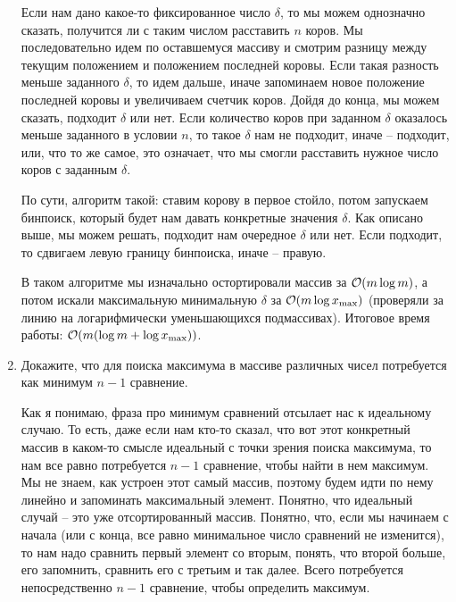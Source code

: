 \begin{enumerate}
\begin{solution}
		Если нам дано какое-то фиксированное число $\delta$, то мы можем однозначно сказать, получится ли с таким числом расставить $n$ коров. Мы последовательно идем по оставшемуся массиву и смотрим разницу между текущим положением и положением последней коровы. Если такая разность меньше заданного $\delta$, то идем дальше, иначе запоминаем новое положение последней коровы и увеличиваем счетчик коров. Дойдя до конца, мы можем сказать, подходит $\delta$ или нет. Если количество коров при заданном $\delta$ оказалось меньше заданного в условии $n$, то такое $\delta$ нам не подходит, иначе -- подходит, или, что то же самое, это означает, что мы смогли расставить нужное число коров с заданным $\delta$.

		По сути, алгоритм такой: ставим корову в первое стойло, потом запускаем бинпоиск, который будет нам давать конкретные значения $\delta$. Как описано выше, мы можем решать, подходит нам очередное $\delta$ или нет. Если подходит, то сдвигаем левую границу бинпоиска, иначе -- правую.

		В таком алгоритме мы изначально остортировали массив за $\mathcal{O}(m \log m)$, а потом искали максимальную минимальную $\delta$ за $\mathcal{O}(m \log{x_{\max}})$ (проверяли за линию на логарифмически уменьшающихся подмассивах). Итоговое время работы: $\mathcal{O}(m (\log{m} + \log{x_{\max}}))$.
	\end{solution}

  \item
    Докажите, что для поиска максимума в массиве различных чисел потребуется
	как минимум $n-1$ сравнение.
	\begin{solution}
		Как я понимаю, фраза про минимум сравнений отсылает нас к идеальному случаю. То есть, даже если нам кто-то сказал, что вот этот конкретный массив в каком-то смысле идеальный с точки зрения поиска максимума, то нам все равно потребуется $n - 1$ сравнение, чтобы найти в нем максимум. Мы не знаем, как устроен этот самый массив, поэтому будем идти по нему линейно и запоминать максимальный элемент. Понятно, что идеальный случай -- это уже отсортированный массив. Понятно, что, если мы начинаем с начала (или с конца, все равно минимальное число сравнений не изменится), то нам надо сравнить первый элемент со вторым, понять, что второй больше, его запомнить, сравнить его с третьим и так далее. Всего потребуется непосредственно $n - 1$ сравнение, чтобы определить максимум.
	\end{solution}
	


\end{enumerate}
